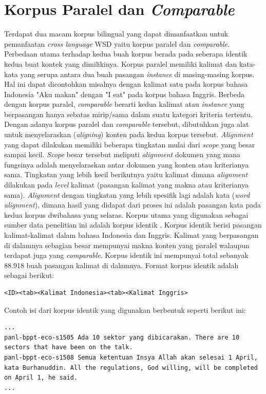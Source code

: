 \section{Korpus Paralel dan \textit{Comparable}}
Terdapat dua macam korpus bilingual yang dapat dimanfaatkan untuk pemanfaatan \textit{cross language } WSD yaitu korpus paralel dan \textit{comparable}. Perbedaan utama terhadap kedua buah korpus berada pada seberapa identik kedua buat kontek yang dimilikinya. Korpus paralel memiliki kalimat dan kata-kata yang serupa antara dua buah pasangan \textit{instance} di masing-masing korpus. Hal ini dapat dicontohkan misalnya dengan kalimat satu pada korpus bahasa Indonesia "Aku makan" dengan "I eat" pada korpus bahasa Inggris. Berbeda dengan korpus paralel, \textit{comparable} berarti kedua kalimat atau \textit{instance} yang berpasangan hanya sebatas mirip/sama dalam suatu kategori kriteria tertentu. Dengan adanya korpus paralel dan \textit{comparable} tersebut, dibutuhkan juga alat untuk menyelaraskan (\textit{aligning}) konten pada kedua korpus tersebut. \textit{Alignment} yang dapat dilakukan memiliki beberapa tingkatan mulai dari \textit{scope} yang besar sampai kecil. \textit{Scope} besar tersebut meliputi \textit{alignment} dokumen yang mana fungsinya adalah menyelaraskan antar dokumen yang konten atau kriterianya sama. Tingkatan yang lebih kecil berikutnya yaitu kalimat dimana \textit{alignment} dilakukan pada \textit{level} kalimat (pasangan kalimat yang makna atau kriterianya sama). \textit{Alignment} dengan tingkatan yang lebih spesifik lagi adalah kata (\textit{word alignment}), dimana hasil yang didapat dari proses ini adalah pasangan kata pada kedua korpus dwibahasa yang selaras. Korpus utama yang digunakan sebagai sumber data penelitian ini adalah korpus identik \citep{larasati2012identic}. Korpus identik berisi pasangan kalimat-kalimat dalam bahasa Indonesia dan Inggris. Kalimat yang berpasangan di dalamnya sebagian besar mempunyai makna konten yang paralel walaupun terdapat juga yang \textit{comparable}. Korpus identik ini mempunyai total sebanyak 88.918 buah pasangan kalimat di dalamnya. Format korpus identik adalah sebagai berikut:
\begin{lstlisting}
<ID><tab><Kalimat Indonesia><tab><Kalimat Inggris>
\end{lstlisting}
Contoh isi dari korpus identik yang digunakan berbentuk seperti berikut ini:
\begin{lstlisting}
...
panl-bppt-eco-s1505	Ada 10 sektor yang dibicarakan.	There are 10 sectors that have been on the talk.
panl-bppt-eco-s1508	Semua ketentuan Insya Allah akan selesai 1 April, kata Burhanuddin.	All the regulations, God willing, will be completed on April 1, he said.
...
\end{lstlisting}


